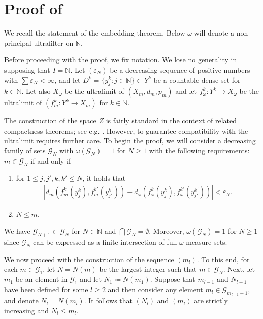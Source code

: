 \documentclass[a4paper,leqno]{amsart}
\numberwithin{equation}{section}
\theoremstyle{remark}
\theoremstyle{remark}
\newcommand{\N}{\mathbb{N}}
\begin{document}
\section{Proof of }\label{section-mapping-package}
We recall the statement of the embedding theorem. Below $\omega$ will denote a non-principal ultrafilter on $\N$.
\GromovEmbedding*

Before proceeding with the proof, we fix notation. We lose no generality in supposing that $I = \mathbb{N}$. Let $( \varepsilon_N )$ be a decreasing sequence of positive numbers with $\sum \varepsilon_N  < \infty$, and let $D^k = \{ y_{j}^{k} \colon j \in \mathbb{N} \} \subset Y^k$ be a countable dense set for $k \in \N$. Let also $X_\omega$ be the ultralimit of $( X_m, d_m, p_m )$ and let $f_\omega^{k} \colon Y^k \to X_\omega$ be the ultralimit of $( f_m^k \colon Y^k \to X_m )$ for $k \in \N$.

The construction of the space $Z$ is fairly standard in the context of related compactness theorems; see e.g. \cite[Proposition 5.2]{wenger-2011-compactness-for-manifolds-and-integral-currents-with-bounded-diameter-and-volume}. However, to guarantee compatibility with the ultralimit requires further care. To begin the proof, we will consider a decreasing family of sets $\mathcal{G}_N$ with $\omega( \mathcal{G}_N ) = 1$ for $N \geq 1$ with the following requirements: $m \in \mathcal{G}_N$ if and only if
\begin{enumerate}
    \item for $1 \leq j, j', k, k' \leq N$, it holds that
    \begin{align*}
        | d_m( f_{m}^{k}( y_{j}^{k} ), f_{m}^{k'}( y_{j'}^{k'} ) ) - d_\omega( f_\omega^{k}( y_{j}^{k} ), f_{\omega}^{k'}( y_{j'}^{k'} ) ) | < \varepsilon_{N}.
    \end{align*}
    \item $N \leq m$.
\end{enumerate}
We have $\mathcal{G}_{N+1} \subset \mathcal{G}_N$ for $N \in \N$ and $\bigcap \mathcal{G}_N = \emptyset$. Moreover, $\omega( \mathcal{G}_{N} ) = 1$ for $N \geq 1$ since $\mathcal{G}_N$ can be expressed as a finite intersection of full $\omega$-measure sets.

We now proceed with the construction of the sequence $( m_l )$. To this end, for each $m \in \mathcal{G}_1$, let $N = N(m)$ be the largest integer such that $m \in \mathcal{G}_N$. Next, let $m_1$ be an element in $\mathcal{G}_1$ and let $N_1 \coloneqq N(m_1)$. Suppose that $m_{l-1}$ and $N_{l-1}$ have been defined for some $l \geq 2$ and then consider any element $m_l \in \mathcal{G}_{ m_{l-1}+1 }$, and denote $N_l = N(m_l)$. It follows that $( N_l )$ and $( m_l )$ are strictly increasing and $N_l \leq m_l$.
\end{document}
